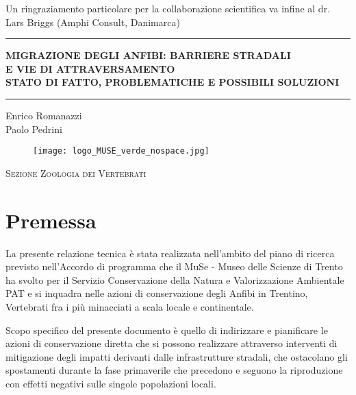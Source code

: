 \documentclass[11pt,a4paper,twoside]{memoir}
\begin{document}
Un ringraziamento particolare per la collaborazione scientifica va infine al dr. Lars Briggs (Amphi Consult, Danimarca) \\



\newpage
\thispagestyle{empty}
\vspace{4cm}
\begin{minipage}[r]{\columnwidth}
\flushright
\hrule

\vspace{.5cm}
{\LARGE \bfseries MIGRAZIONE DEGLI ANFIBI: BARRIERE STRADALI } \\[0.1cm]
{\LARGE \bfseries E VIE DI ATTRAVERSAMENTO} \\[0.1cm]
{\large \bfseries STATO DI FATTO, PROBLEMATICHE E POSSIBILI SOLUZIONI}\\[0.1cm]
\vspace{.2cm}
\hrule

\vspace{1cm}
{Enrico Romanazzi} \\
{Paolo Pedrini} \\
\end{minipage}

\vspace{\fill}
  
\begin{figure}[H]
  \centering
    \texttt{[image: logo\_MUSE\_verde\_nospace.jpg]} 
\end{figure} 
\begin{center}
\textsc{Sezione Zoologia dei Vertebrati}
\end{center}

\cleardoublepage

\setcounter{tocdepth}{2}
\tableofcontents

\flushleftright

\pagestyle{MUSEstyle}
\chapter{Premessa}
\label{chap:premessa}

La presente relazione tecnica è stata realizzata nell’ambito del piano di ricerca previsto nell’Accordo di programma che il MuSe - Museo delle Scienze di Trento ha svolto  per il Servizio Conservazione della Natura e Valorizzazione Ambientale PAT e si inquadra nelle azioni di conservazione degli Anfibi in Trentino, Vertebrati fra i più minacciati a scala locale e continentale.

Scopo specifico del presente documento è quello di indirizzare e pianificare le azioni di conservazione diretta che si possono realizzare attraverso interventi di mitigazione degli impatti derivanti dalle infrastrutture stradali, che ostacolano gli spostamenti durante la fase primaverile che precedono e seguono la riproduzione con effetti negativi sulle singole popolazioni locali.
\end{document}

